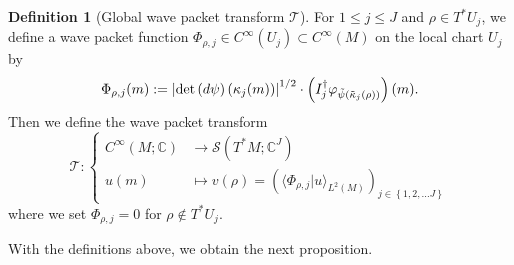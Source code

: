 \documentclass[10pt]{amsart}
\theoremstyle{definition}\newtheorem{defi}[theo]{Definition}\newtheorem{rema}[theo]{Remark}\newtheorem{exam}[theo]{Example}\newtheorem{exem}[theo]{Example}\newtheorem{nota}[theo]{Notation}
\newcommand{\clS}{\mathcal{S}}
\newcommand{\clT}{\mathcal{T}}
\newcommand{\bbC}{\mathbb{C}}
\let\oldtilde\tilde
\renewcommand*{\tilde}[1]{\mathchoice{\widetilde{#1}}{\widetilde{#1}}{\oldtilde{#1}}{\oldtilde{#1}}}
\begin{document}
\begin{cBoxA}{}
\begin{defi}[Global wave packet transform $\clT$]\label{def:Phi_j_rho}
For $1\leq j\leq J$ and $\rho\in T^{*}U_{j}$, we define a wave packet function $\Phi_{\rho,j}\in C^{\infty}(U_{j})\subset C^{\infty}(M)$ on the local chart $U_{j}$ by
\begin{equation}\label{eq:def_wave_packet_Phi_j_rho}
\Phi_{\rho,j}(m):=\left|\det \left(d\psi\right)(\kappa_{j}(m))\right|^{1/2}\cdot\left(I_{j}^{\dagger}\varphi_{\tilde{\psi}\left(\tilde{\kappa}_{j}\left(\rho\right)\right)}\right)(m).
\end{equation}
Then we define the wave packet transform
\begin{equation}\label{eq:def_T_in-1}
\clT:
\begin{cases}
C^{\infty}\left(M;\bbC\right) & \rightarrow\clS\left(T^{*}M;\bbC^{J}\right)\\
u\left(m\right) & \mapsto v\left(\rho\right)=\left(\langle\Phi_{\rho,j}|u\rangle_{L^{2}\left(M\right)}\right)_{j\in\left\{ 1,2,\ldots J\right\} }
\end{cases}
\end{equation}
where we set $\Phi_{\rho,j}=0$ for $\rho\notin T^{*}U_{j}$.
\end{defi}
\end{cBoxA}
\vspace*{-6pt}
With the definitions above, we obtain the next proposition.
\vspace*{-5pt}
\end{document}
